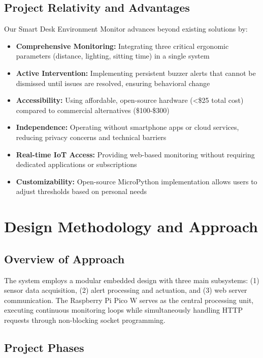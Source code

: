 \documentclass[12pt,a4paper]{article}
\begin{document}
\subsection{Project Relativity and Advantages}

Our Smart Desk Environment Monitor advances beyond existing solutions by:

\begin{itemize}
\item \textbf{Comprehensive Monitoring:} Integrating three critical ergonomic parameters (distance, lighting, sitting time) in a single system
\item \textbf{Active Intervention:} Implementing persistent buzzer alerts that cannot be dismissed until issues are resolved, ensuring behavioral change
\item \textbf{Accessibility:} Using affordable, open-source hardware (<\$25 total cost) compared to commercial alternatives (\$100-\$300)
\item \textbf{Independence:} Operating without smartphone apps or cloud services, reducing privacy concerns and technical barriers
\item \textbf{Real-time IoT Access:} Providing web-based monitoring without requiring dedicated applications or subscriptions
\item \textbf{Customizability:} Open-source MicroPython implementation allows users to adjust thresholds based on personal needs
\end{itemize}

\section{Design Methodology and Approach}

\subsection{Overview of Approach}

The system employs a modular embedded design with three main subsystems: (1) sensor data acquisition, (2) alert processing and actuation, and (3) web server communication. The Raspberry Pi Pico W serves as the central processing unit, executing continuous monitoring loops while simultaneously handling HTTP requests through non-blocking socket programming.

\subsection{Project Phases}
\end{document}
